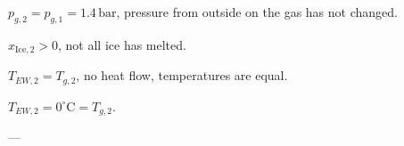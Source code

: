 \( p_{g,2} = p_{g,1} = 1.4 \, \text{bar} \), pressure from outside on the gas has not changed.  

\( x_{\text{Ice},2} > 0 \), not all ice has melted.  

\( T_{EW,2} = T_{g,2} \), no heat flow, temperatures are equal.  

\( T_{EW,2} = 0^\circ \text{C} = T_{g,2} \).  

---
